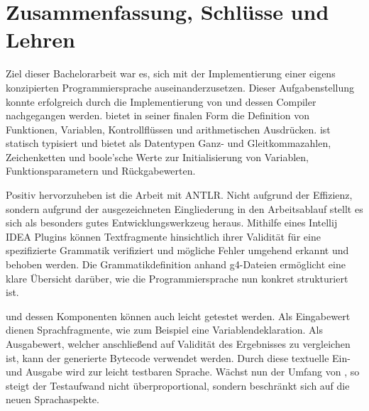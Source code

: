 \chapter{Zusammenfassung, Schlüsse und Lehren}
\label{cha:Schluss}




Ziel dieser Bachelorarbeit war es, sich mit der Implementierung einer eigens konzipierten Programmiersprache auseinanderzusetzen. Dieser Aufgabenstellung konnte erfolgreich durch die Implementierung von \toya und dessen Compiler nachgegangen werden. \Toya bietet in seiner finalen Form die Definition von Funktionen, Variablen, Kontrollflüssen und arithmetischen Ausdrücken. \Toya ist statisch typisiert und bietet als Datentypen Ganz- und Gleitkommazahlen, Zeichenketten und boole'sche Werte zur Initialisierung von Variablen, Funktionsparametern und Rückgabewerten.

Positiv hervorzuheben ist die Arbeit mit ANTLR. Nicht aufgrund der Effizienz, sondern aufgrund der ausgezeichneten Eingliederung in den Arbeitsablauf stellt es sich als besonders gutes Entwicklungswerkzeug heraus. Mithilfe eines Intellij IDEA Plugins können Textfragmente hinsichtlich ihrer Validität für eine spezifizierte Grammatik verifiziert und mögliche Fehler umgehend erkannt und behoben werden. Die Grammatikdefinition anhand g4-Dateien ermöglicht eine klare Übersicht darüber, wie die Programmiersprache nun konkret strukturiert ist.

\Toya und dessen Komponenten können auch leicht getestet werden. Als Eingabewert dienen Sprachfragmente, wie zum Beispiel eine Variablendeklaration. Als Ausgabewert, welcher anschließend auf Validität des Ergebnisses zu vergleichen ist, kann der generierte Bytecode verwendet werden. Durch diese textuelle Ein- und Ausgabe wird \toya zur leicht testbaren Sprache. Wächst nun der Umfang von \toya, so steigt der Testaufwand nicht überproportional, sondern beschränkt sich auf die neuen Sprachaspekte.


